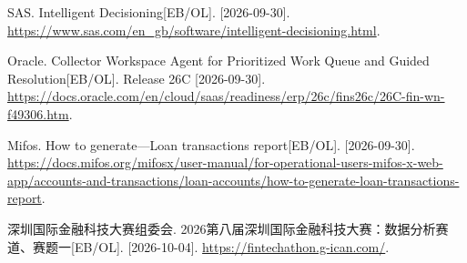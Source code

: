 \begin{enumerate}[label={[\arabic*]},leftmargin=1.9em,itemsep=5bp,parsep=0pt]
\item SAS. Intelligent Decisioning[EB/OL]. [2026-09-30]. \url{https://www.sas.com/en_gb/software/intelligent-decisioning.html}.
\item Oracle. Collector Workspace Agent for Prioritized Work Queue and Guided Resolution[EB/OL]. Release 26C [2026-09-30]. \url{https://docs.oracle.com/en/cloud/saas/readiness/erp/26c/fins26c/26C-fin-wn-f49306.htm}.
\item Mifos. How to generate—Loan transactions report[EB/OL]. [2026-09-30]. \url{https://docs.mifos.org/mifosx/user-manual/for-operational-users-mifos-x-web-app/accounts-and-transactions/loan-accounts/how-to-generate-loan-transactions-report}.
\item 深圳国际金融科技大赛组委会. 2026第八届深圳国际金融科技大赛：数据分析赛道、赛题一[EB/OL]. [2026-10-04]. \url{https://fintechathon.g-ican.com/}.
\end{enumerate}\endgroup

